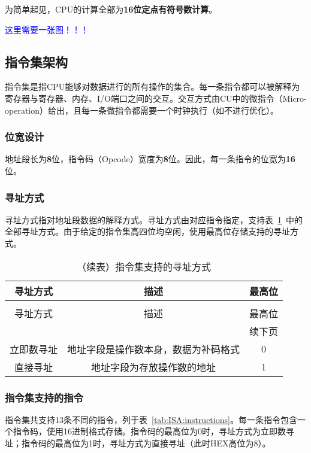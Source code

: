 \documentclass[lang=cn,a4paper,newtx]{elegantpaper}
\begin{document}
为简单起见，CPU的计算全部为\textbf{16位定点有符号数计算}。

\textcolor{blue}{这里需要一张图！！！}




\subsection{指令集架构}
指令集是指CPU能够对数据进行的所有操作的集合。每一条指令都可以被解释为寄存器与寄存器、内存、I/O端口之间的交互。交互方式由CU中的微指令（Micro-operation）给出，且每一条微指令都需要一个时钟执行（如不进行优化）。
\subsubsection{位宽设计}
地址段长为\textbf{8}位，指令码（Opcode）宽度为\textbf{8}位。因此，每一条指令的位宽为\textbf{16}位。
\subsubsection{寻址方式}
寻址方式指对地址段数据的解释方式。寻址方式由对应指令指定，支持表~\ref{tab:ISA:addressingmode}~中的全部寻址方式。由于给定的指令集高四位均空闲，使用最高位存储支持的寻址方式。
\begin{longtable}{c c c}
  \caption{指令集支持的寻址方式} \label{tab:ISA:addressingmode} \\
  \toprule
  寻址方式  & 描述 & 最高位\\
  \midrule
  \endfirsthead
  
  \caption[]{（续表）指令集支持的寻址方式} \\
  \toprule
  寻址方式  & 描述 & 最高位\\
  \midrule
  \endhead
  
  \midrule
  \multicolumn{3}{r}{续下页} \\
  \midrule
  \endfoot
  
  \bottomrule
  \endlastfoot
  
  立即数寻址   &  地址字段是操作数本身，数据为补码格式  & 0\\
  直接寻址 &  地址字段为存放操作数的地址    & 1\\
\end{longtable}

\subsubsection{指令集支持的指令}
指令集共支持13条不同的指令，列于表~\ref{tab:ISA:instructions}。每一条指令包含一个指令码，使用16进制格式存储。指令码的最高位为0时，寻址方式为立即数寻址；指令码的最高位为1时，寻址方式为直接寻址（此时HEX高位为8）。
\end{document}
